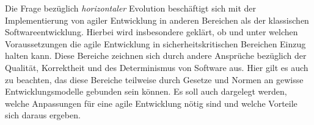 \documentclass[
	12pt,
	a4paper,
	bibtotocnumbered
	]{scrreprt}
\begin{document}
{Die Frage bezüglich \emph{horizontaler} Evolution beschäftigt sich mit der Implementierung von agiler Entwicklung in anderen Bereichen als der klassischen Softwareentwicklung. Hierbei wird insbesondere geklärt, ob und unter welchen Voraussetzungen die agile Entwicklung in sicherheitskritischen Bereichen Einzug halten kann.
Diese Bereiche zeichnen sich durch andere Ansprüche bezüglich der Qualität, Korrektheit und des Determinismus von Software aus.
Hier gilt es auch zu beachten, das diese Bereiche teilweise durch Gesetze und Normen an gewisse Entwicklungsmodelle gebunden sein können.
Es soll auch dargelegt werden, welche Anpassungen für eine agile Entwicklung nötig sind und welche Vorteile sich daraus ergeben.

}

\begin{singlespace}

\setcounter{page}{1}

\end{singlespace}

\tableofcontents
\listoffigures


\cleardoublepage













\printbibliography

\end{document}
